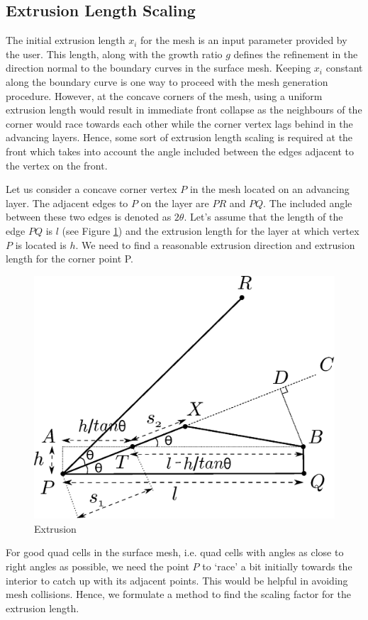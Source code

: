 \subsection{Extrusion Length Scaling}
\label{extrusionLengthScaling}

The initial extrusion length $x_i$ for the mesh is an input parameter provided by the user. This length, along with the growth ratio $g$ defines the refinement in the direction normal to the boundary curves in the surface mesh. Keeping $x_i$ constant along the boundary curve is one way to proceed with the mesh generation procedure. However, at the concave corners of the mesh, using a uniform extrusion length would result in immediate front collapse as the neighbours of the corner would race towards each other while the corner vertex lags behind in the advancing layers. Hence, some sort of extrusion length scaling is required at the front which takes into account the angle included between the edges adjacent to the vertex on the front.


Let us consider a concave corner vertex $P$ in the mesh located on an advancing layer. The adjacent edges to $P$ on the layer are $PR$ and $PQ$. The included angle between these two edges is denoted as $2\theta$. Let's assume that the length of the edge $PQ$ is $l$ (see Figure \ref{fig:basic-diagram-extrusion-factor}) and the extrusion length for the layer at which vertex $P$ is located is $h$. We need to find a reasonable extrusion direction and extrusion length for the corner point P.

\begin{figure}[hbt!]
    \centering
    \includegraphics[width=.6\linewidth]{img/m1/extrusionScaling/extrusionScaling.eps}
    \caption{Extrusion }
    \label{fig:basic-diagram-extrusion-factor}
\end{figure}

For good quad cells in the surface mesh, i.e. quad cells with angles as close to right angles as possible, we need the point $P$ to `race' a bit initially towards the interior to catch up with its adjacent points. This would be helpful in avoiding mesh collisions. Hence, we formulate a method to find the scaling factor for the extrusion length.

